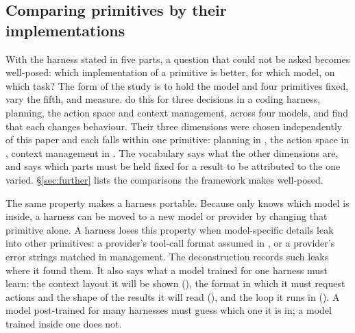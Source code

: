 \subsection{Comparing primitives by their implementations}
With the harness stated in five parts, a question that could not be asked becomes well-posed: which implementation of a primitive is better, for which model, on which task? The form of the study is to hold the model and four primitives fixed, vary the fifth, and measure. \citet{fan2026empirical} do this for three decisions in a coding harness, planning, the action space and context management, across four models, and find that each changes behaviour. Their three dimensions were chosen independently of this paper and each falls within one primitive: planning in , the action space in , context management in . The vocabulary says what the other dimensions are, and says which parts must be held fixed for a result to be attributed to the one varied. \S\ref{sec:further} lists the comparisons the framework makes well-posed.

The same property makes a harness portable. Because only  knows which model is inside, a harness can be moved to a new model or provider by changing that primitive alone. A harness loses this property when model-specific details leak into other primitives: a provider's tool-call format assumed in , or a provider's error strings matched in  management. The deconstruction records such leaks where it found them. It also says what a model trained for one harness must learn: the context layout it will be shown (), the format in which it must request actions and the shape of the results it will read (), and the loop it runs in (). A model post-trained for many harnesses must guess which one it is in; a model trained inside one does not.

